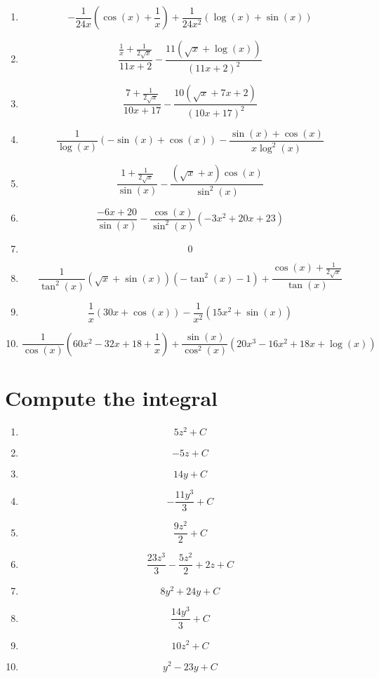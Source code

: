 \documentclass{article}
\begin{document}
        \begin{enumerate}
        \item$$- \frac{1}{24 x} \left(\cos{\left (x \right )} + \frac{1}{x}\right) + \frac{1}{24 x^{2}} \left(\log{\left (x \right )} + \sin{\left (x \right )}\right)$$
\item$$\frac{\frac{1}{x} + \frac{1}{2 \sqrt{x}}}{11 x + 2} - \frac{11 \left(\sqrt{x} + \log{\left (x \right )}\right)}{\left(11 x + 2\right)^{2}}$$
\item$$\frac{7 + \frac{1}{2 \sqrt{x}}}{10 x + 17} - \frac{10 \left(\sqrt{x} + 7 x + 2\right)}{\left(10 x + 17\right)^{2}}$$
\item$$\frac{1}{\log{\left (x \right )}} \left(- \sin{\left (x \right )} + \cos{\left (x \right )}\right) - \frac{\sin{\left (x \right )} + \cos{\left (x \right )}}{x \log^{2}{\left (x \right )}}$$
\item$$\frac{1 + \frac{1}{2 \sqrt{x}}}{\sin{\left (x \right )}} - \frac{\left(\sqrt{x} + x\right) \cos{\left (x \right )}}{\sin^{2}{\left (x \right )}}$$
\item$$\frac{- 6 x + 20}{\sin{\left (x \right )}} - \frac{\cos{\left (x \right )}}{\sin^{2}{\left (x \right )}} \left(- 3 x^{2} + 20 x + 23\right)$$
\item$$0$$
\item$$\frac{1}{\tan^{2}{\left (x \right )}} \left(\sqrt{x} + \sin{\left (x \right )}\right) \left(- \tan^{2}{\left (x \right )} - 1\right) + \frac{\cos{\left (x \right )} + \frac{1}{2 \sqrt{x}}}{\tan{\left (x \right )}}$$
\item$$\frac{1}{x} \left(30 x + \cos{\left (x \right )}\right) - \frac{1}{x^{2}} \left(15 x^{2} + \sin{\left (x \right )}\right)$$
\item$$\frac{1}{\cos{\left (x \right )}} \left(60 x^{2} - 32 x + 18 + \frac{1}{x}\right) + \frac{\sin{\left (x \right )}}{\cos^{2}{\left (x \right )}} \left(20 x^{3} - 16 x^{2} + 18 x + \log{\left (x \right )}\right)$$
        \end{enumerate}
        

        \section{Compute the integral}
        
        \begin{enumerate}
        \item$$5 z^{2} + C $$
\item$$- 5 z + C $$
\item$$14 y + C $$
\item$$- \frac{11 y^{3}}{3} + C $$
\item$$\frac{9 z^{2}}{2} + C $$
\item$$\frac{23 z^{3}}{3} - \frac{5 z^{2}}{2} + 2 z + C $$
\item$$8 y^{2} + 24 y + C $$
\item$$\frac{14 y^{3}}{3} + C $$
\item$$10 z^{2} + C $$
\item$$y^{2} - 23 y + C $$
        \end{enumerate}
        
\end{document}
